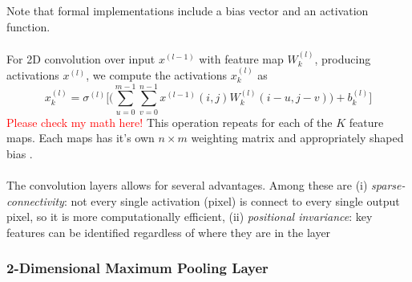 \documentclass[12pt,letterpaper]{article}
\begin{document}
Note that formal implementations include a bias vector and an activation function.

\paragraph*{}For 2D convolution over input $x^{(l-1)}$ with feature map $W^{(l)}_k$, producing activations $x^{(l)}$, we compute the activations $x^{(l)}_{k}$ as \cite{Goodfellow}
\begin{equation}
\label{eqn-ConvFeedForward}
x^{(l)}_k = \sigma^{(l)}\bigg[ \Big( \sum_{u=0}^{m-1} \sum_{v=0}^{n-1} x^{(l-1)}(i,j) W^{(l)}_k(i - u,j - v) \Big) + b^{(l)}_k \bigg]
\end{equation}
\textcolor{red}{Please check my math here!}
This operation repeats for each of the $K$ feature maps. Each maps has it's own $n \times m$ weighting matrix and appropriately shaped bias .

\paragraph*{}The convolution layers allows for several advantages. Among these are (i) \textit{sparse-connectivity}: not every single activation (pixel) is connect to every single output pixel, so it is more computationally efficient, (ii) \textit{positional invariance}: key features can be identified regardless of where they are in the layer


\subsubsection{2-Dimensional Maximum Pooling Layer}
\end{document}
